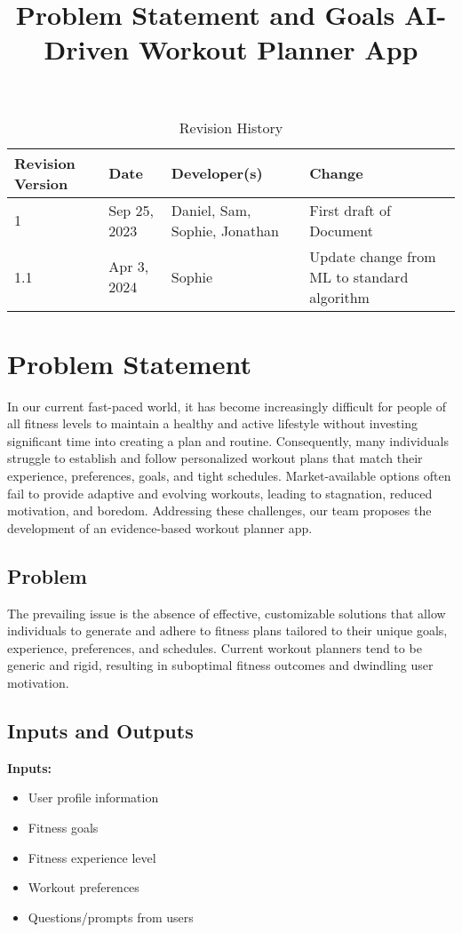 \documentclass{article}
\title{Problem Statement and Goals AI-Driven Workout Planner App\\\progname}
\author{\authname}  %
\date{}
\date{}
\begin{document}
    \maketitle
    \begin{table}[hp]
        \centering
        \caption{Revision History} \label{TblRevisionHistory}
        \begin{tabularx}{\textwidth}{lllX}
            \toprule
            \textbf{Revision Version} & \textbf{Date} & \textbf{Developer(s)} & \textbf{Change}\\
            \midrule
            1 & Sep 25, 2023 & Daniel, Sam, Sophie, Jonathan & First draft of Document\\
            1.1 & Apr 3, 2024 & Sophie & Update change from ML to standard algorithm\\
            \bottomrule
        \end{tabularx}
    \end{table}
    \section{Problem Statement}

    In our current fast-paced world, it has become increasingly difficult for people of all fitness levels to maintain a healthy and active lifestyle without investing significant time into creating a plan and routine. Consequently, many individuals struggle to establish and follow personalized workout plans that match their experience, preferences, goals, and tight schedules. Market-available options often fail to provide adaptive and evolving workouts, leading to stagnation, reduced motivation, and boredom. Addressing these challenges, our team proposes the development of an evidence-based workout planner app.

    \subsection{Problem}

    The prevailing issue is the absence of effective, customizable solutions that allow individuals to generate and adhere to fitness plans tailored to their unique goals, experience, preferences, and schedules. Current workout planners tend to be generic and rigid, resulting in suboptimal fitness outcomes and dwindling user motivation.

    \subsection{Inputs and Outputs}
    \textbf{Inputs:}
    \begin{itemize}
        \item User profile information
        \item Fitness goals
        \item Fitness experience level
        \item Workout preferences
        \item Questions/prompts from users
    \end{itemize}
\end{document}
